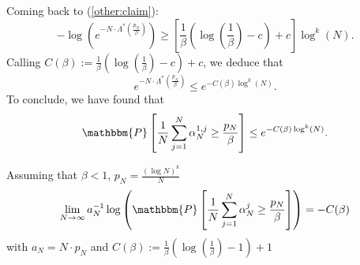 \begin{remark}
Coming back to (\ref{other:claim}): \[ - \log \left( e^{- N \cdot \Lambda^*\left(\frac{p_N}{\beta}\right)} \right) \geq \left[ \frac{1}{\beta} \left( \log \left( \frac{1}{\beta} \right) - c \right) + c \right] \log^k(N). \]  Calling $C(\beta) := \frac{1}{\beta} \left( \log \left( \frac{1}{\beta} \right) - c \right) + c$, we deduce that \[ e^{- N \cdot \Lambda^*\left(\frac{p_N}{\beta}\right)} \leq e^{- C(\beta) \log^k(N)}. \]
To conclude, we have found that \[ \mathbbm{P} \left[ \frac{1}{N} \sum_{j = 1}^N \alpha^{1, j}_N \geq \frac{p_N}{\beta} \right] \leq e^{- C(\beta) \log^k(N)}. \]
\end{remark}
\begin{theorem}
Assuming that $\beta<1$, $p_N=\frac{(\log N)^k}{N}$
\[\lim_{N\rightarrow\infty}a^{-1}_N\log\left(\mathbbm{P} \left[ \frac{1}{N} \sum_{j = 1}^N \alpha^{j}_N \geq \frac{p_N}{\beta} \right]\right)=-C(\beta)\]
with $a_N=N\cdot p_N$ and $C(\beta) := \frac{1}{\beta} \left( \log \left( \frac{1}{\beta} \right) - 1 \right) + 1$
\end{theorem}
